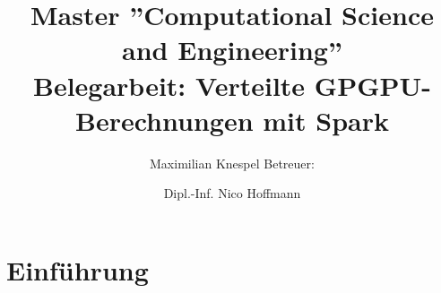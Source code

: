 \title{Master ''Computational Science and Engineering''\\
       Belegarbeit: Verteilte GPGPU-Berechnungen mit Spark}
\author {
	Maximilian Knespel
	\newline	\newline
	Betreuer: \and Dipl.-Inf. Nico Hoffmann
}
\date{}




\begin{frame}
	\titlepage
\end{frame}



\section{Einführung}


